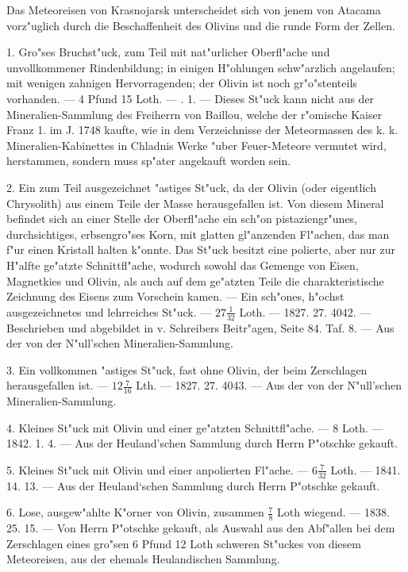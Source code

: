 \documentclass[a4paper, 11pt, oneside, polutonikogreek, german]{article}
\begin{document}
Das Meteoreisen von Krasnojarsk unterscheidet sich von jenem von Atacama vorz"uglich durch die Beschaffenheit des Olivins und die runde Form der Zellen.

1. Gro"ses Bruchst"uck, zum Teil mit nat"urlicher Oberfl"ache und unvollkommener Rindenbildung; in einigen H"ohlungen schw"arzlich angelaufen; mit wenigen zahnigen Hervorragenden; der Olivin ist noch gr"o"stenteils vorhanden. --- 4 Pfund 15 Loth. --- . 1. --- Dieses St"uck kann nicht aus der Mineralien-Sammlung des Freiherrn von Baillou, welche der r"omische Kaiser Franz 1. im J. 1748 kaufte, wie in dem Verzeichnisse der Meteormassen des k. k. Mineralien-Kabinettes in Chladnis Werke "uber Feuer-Meteore vermutet wird, herstammen, sondern muss sp"ater angekauft worden sein.

2. Ein zum Teil ausgezeichnet "astiges St"uck, da der Olivin (oder eigentlich Chrysolith) aus einem Teile der Masse herausgefallen ist. Von diesem Mineral befindet sich an einer Stelle der Oberfl"ache ein sch"on pistaziengr"unes, durchsichtiges, erbsengro"ses Korn, mit glatten gl"anzenden Fl"achen, das man f"ur einen Kristall halten k"onnte. Das St"uck besitzt eine polierte, aber nur zur H"alfte ge"atzte Schnittfl"ache, wodurch sowohl das Gemenge von Eisen, Magnetkies und Olivin, als auch auf dem ge"atzten Teile die charakteristische Zeichnung des Eisens zum Vorschein kamen. --- Ein sch"ones, h"ochst ausgezeichnetes und lehrreiches St"uck. --- $27\frac{1}{32}$ Loth. --- 1827. 27. 4042. --- Beschrieben und abgebildet in v. Schreibers Beitr"agen, Seite 84. Taf. 8. --- Aus der von der N"ull'schen Mineralien-Sammlung.

3. Ein vollkommen "astiges St"uck, fast ohne Olivin, der beim Zerschlagen herausgefallen ist. --- $12\frac{7}{16}$ Lth. --- 1827. 27. 4043. --- Aus der von der N"ull'schen Mineralien-Sammlung.

4. Kleines St"uck mit Olivin und einer ge"atzten Schnittfl"ache. --- 8 Loth. --- 1842. 1. 4. --- Aus der Heuland'schen Sammlung durch Herrn P"otschke gekauft.

5. Kleines St"uck mit Olivin und einer anpolierten Fl"ache. --- $6\frac{7}{32}$ Loth. --- 1841. 14. 13. --- Aus der Heuland‘schen Sammlung durch Herrn P"otschke gekauft.

6. Lose, ausgew"ahlte K"orner von Olivin, zusammen $\frac{7}{8}$ Loth wiegend. --- 1838. 25. 15. --- Von Herrn P"otschke gekauft, als Auswahl aus den Abf"allen bei dem Zerschlagen eines gro"sen 6 Pfund 12 Loth schweren St"uckes von diesem Meteoreisen, aus der ehemals Heulandischen Sammlung.
\end{document}
